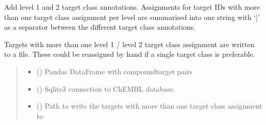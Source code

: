 \documentclass[letterpaper,10pt,english]{sphinxmanual}
\begin{document}
\begin{fulllineitems}
\label{\detokenize{add_chembl_target_class_annotations:add_chembl_target_class_annotations.add_chembl_target_class_annotations}}
\pysigstartsignatures
{}
\pysigstopsignatures
\sphinxAtStartPar
Add level 1 and 2 target class annotations.
Assignments for target IDs with more than one target class assignment per level
are summarised into one string with ‘|’ as a separator
between the different target class annotations.

\sphinxAtStartPar
Targets with more than one level 1 / level 2 target class assignment are written to a file.
These could be reassigned by hand if a single target class is preferable.
\begin{quote}\begin{description}
\begin{itemize}
\item {} 
\sphinxAtStartPar
{} () \textendash{} Pandas DataFrame with compound\sphinxhyphen{}target pairs

\item {} 
\sphinxAtStartPar
{} () \textendash{} Sqlite3 connection to ChEMBL database.

\item {} 
\sphinxAtStartPar
{} () \textendash{} Path to write the targets with more than one target class assignment to


\end{itemize}
\end{description}
\end{quote}
\end{fulllineitems}
\end{document}
